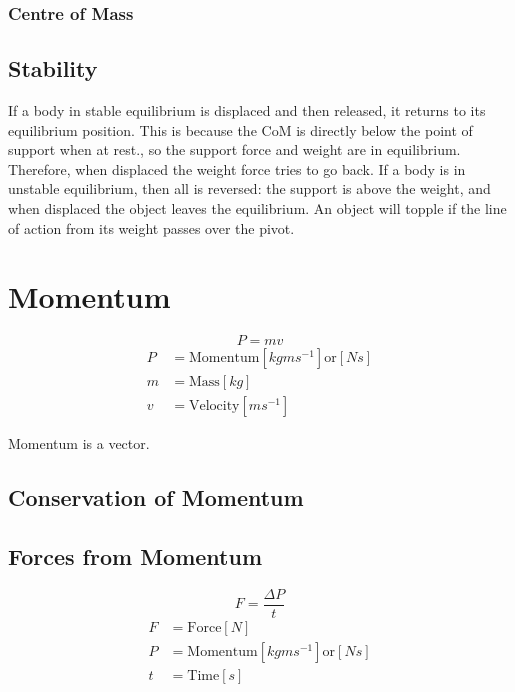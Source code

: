 \subsection{Centre of Mass}


\section{Stability}
If a body in stable equilibrium is displaced and then released, it returns to its equilibrium position. This is because the CoM is directly below the point of support when at rest., so the support force and weight are in equilibrium. Therefore, when displaced the weight force tries to go back.
If a body is in unstable equilibrium, then all is reversed: the support is above the weight, and when displaced the object leaves the equilibrium.
An object will topple if the line of action from its weight passes over the pivot.



\chapter{Momentum}
\[P = mv\]
\begin{align*}
	P &= \text{Momentum} \left[ kgms^{-1} \right] \text{or} \left[ Ns \right] \\
	m &= \text{Mass} \left[ kg \right] \\
	v &= \text{Velocity} \left[ ms^{-1} \right] 
\end{align*}

Momentum is a vector.

\section{Conservation of Momentum}

\section{Forces from Momentum}
\[F = \frac{\Delta P}{t}\]
\begin{align*}
	F &= \text{Force} \left[ N \right] \\
	P &= \text{Momentum} \left[ kgms^{-1} \right] \text{or} \left[ Ns \right] \\
	t &= \text{Time} \left[ s \right] 
\end{align*}

